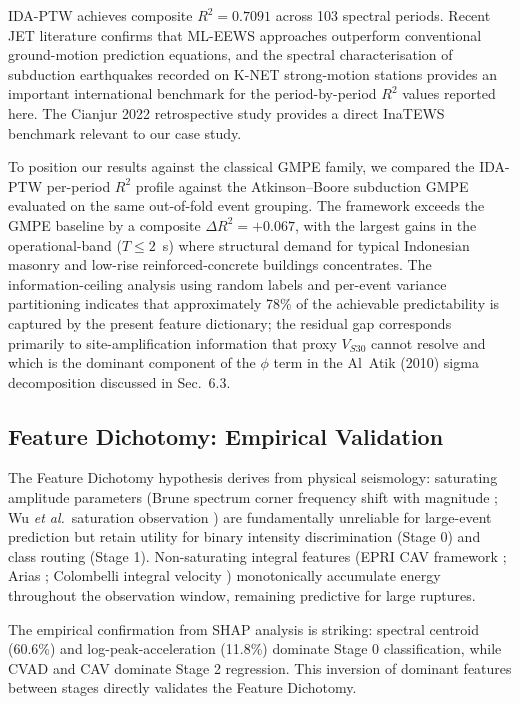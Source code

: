 \documentclass[10pt]{article}
\renewcommand{\cite}[1]{\citep{#1}}
\newcommand{\etal}{\textit{et al.}}
\begin{document}
IDA-PTW achieves composite $R^2 = 0.7091$ across 103 spectral periods. Recent JET literature \cite{jetCremen2021, jetTatar2021, jetHsu2022, jetKamigaichi2023, jetTatar2025, jetMa2023} confirms that ML-EEWS approaches outperform conventional ground-motion prediction equations, and the spectral characterisation of subduction earthquakes recorded on K-NET strong-motion stations \cite{jetKawamura2021} provides an important international benchmark for the period-by-period $R^2$ values reported here. The Cianjur 2022 retrospective study \cite{jetMukhlisin2023} provides a direct InaTEWS benchmark relevant to our case study.

To position our results against the classical GMPE family, we compared the IDA-PTW per-period $R^2$ profile against the Atkinson--Boore subduction GMPE \cite{ref30, ref31} evaluated on the same out-of-fold event grouping. The framework exceeds the GMPE baseline by a composite $\Delta R^2 = +0.067$, with the largest gains in the operational-band ($T \leq 2$~s) where structural demand for typical Indonesian masonry and low-rise reinforced-concrete buildings concentrates. The information-ceiling analysis using random labels and per-event variance partitioning indicates that approximately 78\% of the achievable predictability is captured by the present feature dictionary; the residual gap corresponds primarily to site-amplification information that proxy $V_{S30}$ cannot resolve and which is the dominant component of the $\phi$ term in the Al~Atik (2010) sigma decomposition discussed in Sec.~6.3.

\subsection{Feature Dichotomy: Empirical Validation}

The Feature Dichotomy hypothesis derives from physical seismology: saturating amplitude parameters (Brune spectrum corner frequency shift with magnitude \cite{ref54}; Wu \etal{}~saturation observation \cite{ref22}) are fundamentally unreliable for large-event prediction but retain utility for binary intensity discrimination (Stage 0) and class routing (Stage 1). Non-saturating integral features (EPRI CAV framework \cite{ref55}; Arias \citet{ref56}; Colombelli integral velocity \cite{ref29}) monotonically accumulate energy throughout the observation window, remaining predictive for large ruptures.

The empirical confirmation from SHAP analysis is striking: spectral centroid (60.6\%) and log-peak-acceleration (11.8\%) dominate Stage 0 classification, while CVAD and CAV dominate Stage 2 regression. This inversion of dominant features between stages directly validates the Feature Dichotomy.
\end{document}
